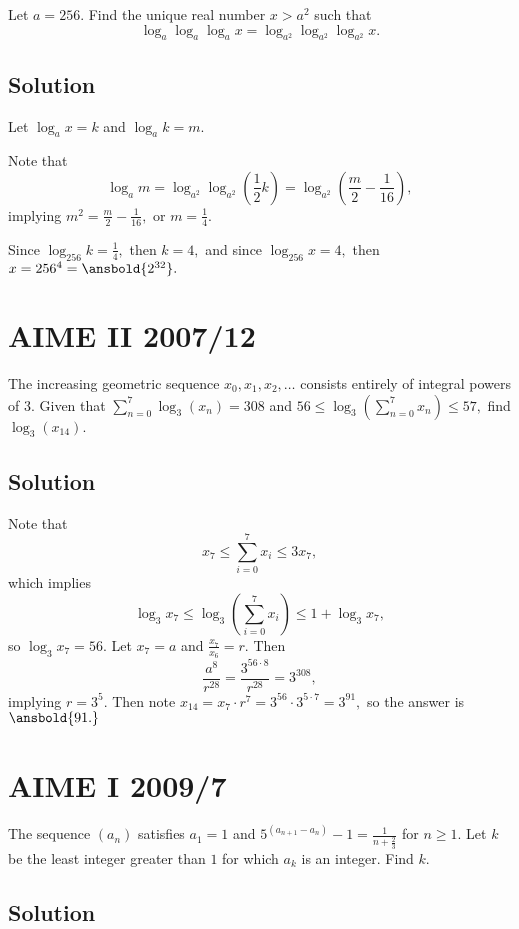 \documentclass{article}
\begin{document}
Let $a=256$. Find the unique real number $x>a^2$ such that
\[\log_a \log_a \log_a x = \log_{a^2} \log_{a^2} \log_{a^2} x.\]

\subsection{Solution}

Let $\log_a{x}=k$ and $\log_{a}k=m.$

Note that \[\log_a{m}=\log_{a^2}\log_{a^2}(\frac{1}{2}k)=\log_{a^2}(\frac{m}{2}-\frac{1}{16}),\] implying $m^2=\frac{m}{2}-\frac{1}{16},$ or $m=\frac{1}{4}.$

Since $\log_{256}k=\frac{1}{4},$ then $k=4,$ and since $\log_{256}x=4,$ then $x=256^4=\ansbold{2^{32}}.$

\pagebreak\section{AIME II 2007/12}

The increasing geometric sequence $x_{0},x_{1},x_{2},\ldots$ consists entirely of integral powers of $3.$ Given that $\sum_{n=0}^{7}\log_{3}(x_{n}) = 308$ and $56 \leq \log_{3}\left ( \sum_{n=0}^{7}x_{n}\right ) \leq 57,$ find $\log_{3}(x_{14}).$

\subsection{Solution}

Note that
    \[x_7\leq\sum\limits_{i=0}^{7}x_i \leq 3x_7,\]
    which implies
    \[\log_{3}x_7\leq\log_3(\sum\limits_{i=0}^{7}x_i)\leq 1+\log_{3}x_7,\]
    so $\log_{3}x_7=56.$
    Let $x_7=a$ and $\frac{x_7}{x_6}=r.$ Then
    \[\frac{a^8}{r^28}=\frac{3^{56\cdot 8}}{r^28}=3^{308},\]
    implying $r=3^5.$ Then note $x_14=x_7\cdot r^7=3^{56}\cdot 3^{5\cdot 7}=3^{91},$ so the answer is $\ansbold{91.}$

\pagebreak\section{AIME I 2009/7}

The sequence $(a_n)$ satisfies $a_1 = 1$ and $5^{(a_{n + 1} - a_n)} - 1 = \frac {1}{n + \frac {2}{3}}$ for $n \geq 1$. Let $k$ be the least integer greater than $1$ for which $a_k$ is an integer. Find $k$.

\subsection{Solution}
\end{document}
